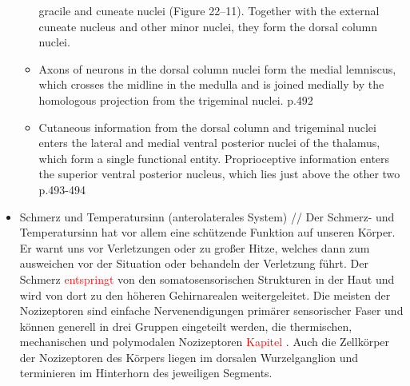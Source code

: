 \documentclass[12pt,a4paper,pdftex]{article}
\begin{document}
\begin{itemize}
\begin{itemize}
        gracile and cuneate nuclei (Figure 22–11). Together
        with the external cuneate nucleus and other minor
        nuclei, they form the dorsal column nuclei. \\ 
        \item Axons of neurons in the dorsal column nuclei form the medial lemniscus, which crosses the midline in the medulla and is joined medially by the homologous projection from the trigeminal nuclei. \cite{kandel2013principles} p.492
        \item Cutaneous information from the dorsal column
        and trigeminal nuclei enters the lateral and medial
        ventral posterior nuclei of the thalamus, which form
        a single functional entity. Proprioceptive information
        enters the superior ventral posterior nucleus, which
        lies just above the other two \cite{kandel2013principles} p.493-494
    \end{itemize}
    
    \item Schmerz und Temperatursinn (anterolaterales System)
    //
    Der Schmerz- und Temperatursinn hat vor allem eine schützende Funktion auf unseren Körper. Er warnt uns vor Verletzungen oder zu großer Hitze, welches dann zum ausweichen vor der Situation oder behandeln der Verletzung führt. Der Schmerz \textcolor{red}{entspringt} von den somatosensorischen Strukturen in der Haut und wird von dort zu den höheren Gehirnarealen weitergeleitet. 
    Die meisten der Nozizeptoren sind einfache Nervenendigungen primärer sensorischer Faser und können generell in drei Gruppen eingeteilt werden, die thermischen, mechanischen und polymodalen Nozizeptoren \textcolor{red}{Kapitel} \citep{kandel2013principles}. Auch die Zellkörper der Nozizeptoren des Körpers liegen im dorsalen Wurzelganglion und terminieren im Hinterhorn des jeweiligen Segments. 
    

\end{itemize}
\end{document}
